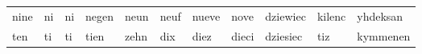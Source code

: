 \documentclass[a4paper, 20pt]{article}
\begin{document}
\begin{table}[h]
{\begin{tabular}{|lllllllllll|}
nine                                                 & ni                                                    & ni                                                   & negen                                                   & neun                                                 & neuf                                                   & nueve                                                  & nove                                                   & dziewiec                                             & kilenc                                                & yhdeksan                                             \\
ten                                                  & ti                                                    & ti                                                   & tien                                                    & zehn                                                 & dix                                                    & diez                                                   & dieci                                                  & dziesiec                                             & tiz                                                   & kymmenen                                             \\ \hline
\end{tabular}
}
\end{table}
\end{document}
